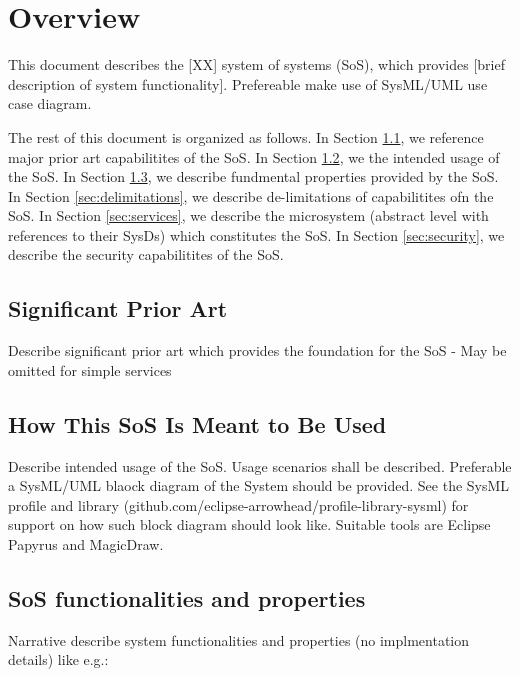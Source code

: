 \documentclass[a4paper]{arrowhead}
\begin{document}
\section{Overview}
\label{sec:overview}
\color{red}
This document describes the [XX] system of systems (SoS), which provides [brief
description of system functionality]. Prefereable make use of SysML/UML 
use case diagram. 
\color{black}

The rest of this document is organized as follows.
In Section \ref{sec:prior_art}, we reference major prior art capabilitites
of the SoS.
In Section \ref{sec:use}, we the intended usage of the SoS.
In Section \ref{sec:properties}, we describe fundmental properties
provided by the SoS.
In Section \ref{sec:delimitations}, we describe de-limitations of capabilitites
ofn the SoS.
In Section \ref{sec:services}, we describe the microsystem (abstract
level with references to their SysDs) which
constitutes the SoS.
In Section \ref{sec:security}, we describe the security capabilitites
of the SoS.

\newpage

\subsection{Significant Prior Art}
\label{sec:prior_art}

\color{red}
Describe significant prior art which provides the
foundation for the SoS - May be omitted for simple services
\color{black}  

\subsection{How This SoS Is Meant to Be Used}
\label{sec:use}

\color{red}
Describe intended usage of the SoS. Usage scenarios
shall be described. Preferable a SysML/UML blaock diagram of the
System should be provided. See the SysML profile and library
(github.com/eclipse-arrowhead/profile-library-sysml) for
support on how such block diagram should look like. Suitable tools are
Eclipse Papyrus and MagicDraw.
\color{black}  

\subsection{SoS functionalities and properties}
\label{sec:properties}

\color{red}
Narrative describe system functionalities and properties (no
implmentation details) like e.g.:
\end{document}
